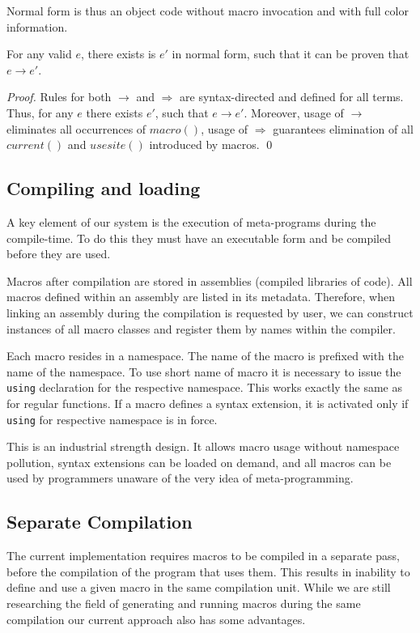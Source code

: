 \documentclass{llncs}
\begin{document}
Normal form is thus an object code without macro invocation and with full
color information.

\begin{theorem}
For any valid $e$, there exists is $e'$ in normal form,
such that it can be proven that $e \rightarrow e'$.
\end{theorem}

\begin{proof}
Rules for both $\rightarrow$ and $\Rightarrow$ are
syntax-directed and defined for all terms. Thus, for any $e$ there exists
$e'$, such that $e \rightarrow e'$. Moreover, usage of $\rightarrow$
eliminates all occurrences of $macro()$, usage of $\Rightarrow$ guarantees
elimination of all $current()$ and $usesite()$ introduced by macros.
\qed
\end{proof}

\subsection{Compiling and loading}
A key element of our system is the execution of meta-programs during 
the compile-time. To do this they must have an executable form and be
compiled before they are used.

Macros after compilation are stored in assemblies (compiled libraries
of code). All macros defined within an assembly are listed in its metadata.
Therefore, when linking an assembly during the compilation is requested by user,
we can construct instances of all macro classes and register them by
names within the compiler.

Each macro resides in a namespace. The name of the macro is prefixed
with the name of the namespace. To use short name of macro it is necessary to
issue the \verb,using, declaration for the respective namespace. This
works exactly the same as for regular functions. If a macro defines a
syntax extension, it is activated only if \verb,using, for respective
namespace is in force.

This is an industrial strength design. It allows macro usage without namespace
pollution, syntax extensions can be loaded on demand, and all macros
can be used by programmers unaware of the very idea of meta-programming.

\subsection{Separate Compilation}
The current implementation requires macros to be compiled in a separate pass,
before the compilation of the program that uses them. This results in inability
to define and use a given macro in the same compilation unit. While we
are still researching the field of generating and running macros during
the same compilation our current approach also has some advantages.
\end{document}
